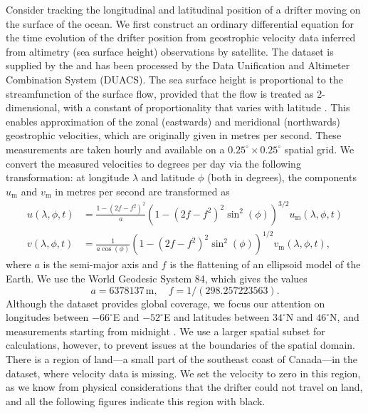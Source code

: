 Consider tracking the longitudinal and latitudinal position of a drifter moving on the surface of the ocean.
We first construct an ordinary differential equation for the time evolution of the drifter position from geostrophic velocity data inferred from altimetry (sea surface height) observations by satellite.
The dataset is supplied by the \citet{E.U.CopernicusMarineServiceCMEMS_2020_GlobalOceanGridded} and has been processed by the Data Unification and Altimeter Combination System (DUACS).
The sea surface height is proportional to the streamfunction of the surface flow, provided that the flow is treated as 2-dimensional, with a constant of proportionality that varies with latitude \citep{Park_2004_DeterminationSurfaceGeostrophic,DoglioniEtAl_2021_SeaSurfaceHeight}.
This enables approximation of the zonal (eastwards) and meridional (northwards) geostrophic velocities, which are originally given in metres per second.
These measurements are taken hourly and available on a \(0.25^\circ \times 0.25^\circ\) spatial grid.
We convert the measured velocities to degrees per day via the following transformation: at longitude \(\lambda\) and latitude \(\phi\) (both in degrees), the components \(u_{\mathrm{m}}\) and \(v_{\mathrm{m}}\) in metres per second are transformed as \citep{Capderou_2014_HandbookSatelliteOrbits}
\begin{subequations}\label{eqn:natl_vel_conv}
	\begin{align}
		u\!\left(\lambda, \phi, t\right) & = \frac{1 - \left(2f - f^2\right)^2}{a}\left(1 - \left(2f - f^2\right)^2\sin^2\!\left(\phi\right)\right)^{3/2} u_{\mathrm{m}}\!\left(\lambda, \phi, t\right) \\
		v\!\left(\lambda, \phi, t\right) & = \frac{1}{a\cos\!\left(\phi\right)}\left(1 - \left(2f - f^2\right)^2\sin^2\!\left(\phi\right)\right)^{1/2} v_{\mathrm{m}}\!\left(\lambda, \phi, t\right),
	\end{align}
\end{subequations}
where \(a\) is the semi-major axis and \(f\) is the flattening of an ellipsoid model of the Earth.
We use the World Geodesic System 84, which gives the values \citep{Capderou_2014_HandbookSatelliteOrbits}
\[
	a = 6378137\,\unit{\metre}, \quad f = 1 / (298.257223563).
\]
Although the dataset provides global coverage, we focus our attention on longitudes between \(-66^\circ\)E and \(-52^\circ\)E and latitudes between \(34^\circ\)N and \(46^\circ\)N, and measurements starting from midnight .
We use a larger spatial subset for calculations, however, to prevent issues at the boundaries of the spatial domain.
There is a region of land---a small part of the southeast coast of Canada---in the dataset, where velocity data is missing.
We set the velocity to zero in this region, as we know from physical considerations that the drifter could not travel on land, and all the following figures indicate this region with black.

